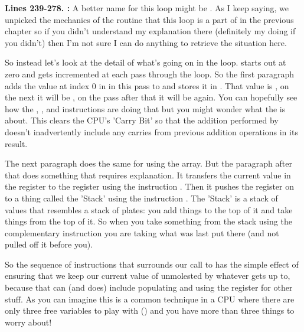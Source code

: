 \textbf{Lines 239-278. :} A better name for this loop might be . As I keep saying, we unpicked the mechanics
of the  routine that this loop is a part of in the previous chapter so if you didn't understand my explanation there (definitely my doing if you didn't)
then I'm not sure I can do anything to retrieve the situation here.

So instead let's look at the detail of what's going on in the loop.  starts out at zero and gets incremented at
each pass through the loop. So the first paragraph adds the value at index 0 in  in this pass to 
and stores it in . That value is , on the next it will be , on the pass after that
it will be  again. You can hopefully see how the , , and  instructions are doing that
but you might wonder what the  is about. This clears the CPU's 'Carry Bit' so that the addition performed by 
doesn't inadvertently include any carries from previous addition operations in its result.

The next paragraph does the same for  using the  array. But the paragraph after
that does something that requires explanation. It transfers the current value in the  register to the  register
using the instruction . Then it pushes the  register on to a thing called the 'Stack' using the instruction
. The 'Stack' is a stack of values that resembles a stack of plates: you add things to the top of it and take things
from the top of it. So when you take something from the stack using the complementary instruction  you are taking
what was last put there (and not pulled off it before you).

So the  sequence of instructions that surrounds our call to  has the
simple effect of ensuring that we keep our current value of  unmolested by whatever 
gets up to, because that can (and does) include populating and using the  register for other stuff. As you can imagine
this is a common technique in a CPU where there are only three free variables to play with () and you have more than three things
to worry about!


